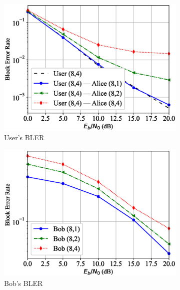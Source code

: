 \begin{figure}[tp!]
	\begin{subfigure}{0.28\textwidth}
		\includegraphics[width=\linewidth]{figs/covert_autoencoder_bler_rician}
		\caption{User's BLER}
		\label{fig:rician_resutls_ae}
	\end{subfigure}
	\hspace*{\fill}
	\begin{subfigure}{0.28\textwidth}
		\includegraphics[width=\linewidth]{figs/bob_bler_rician}
		\caption{Bob's BLER}
		\label{fig:rician_resutls_bob}	
	\end{subfigure}
	\hspace*{\fill}
	\begin{subfigure}{0.28\textwidth}

\end{subfigure}
\end{figure}

